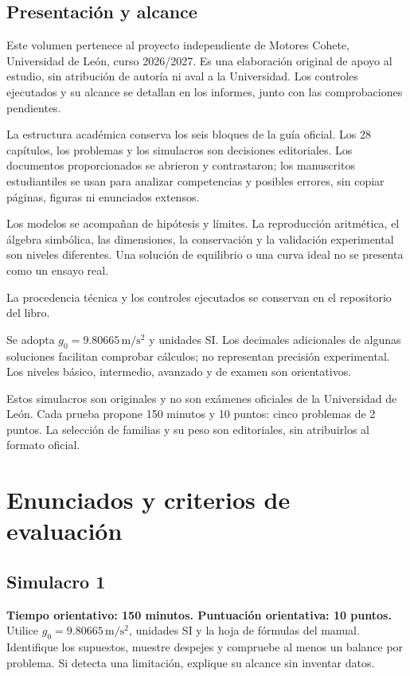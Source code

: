 
\renewcommand{\studiumvolumetype}{simulacros}

\frontmatter
\studiumreadingguide
\chapter*{Presentación y alcance}
Este volumen pertenece al proyecto independiente de Motores Cohete, Universidad de León, curso 2026/2027. Es una elaboración original de apoyo al estudio, sin atribución de autoría ni aval a la Universidad. Los controles ejecutados y su alcance se detallan en los informes, junto con las comprobaciones pendientes.

La estructura académica conserva los seis bloques de la guía oficial. Los 28 capítulos, los problemas y los simulacros son decisiones editoriales. Los documentos proporcionados se abrieron y contrastaron; los manuscritos estudiantiles se usan para analizar competencias y posibles errores, sin copiar páginas, figuras ni enunciados extensos.

Los modelos se acompañan de hipótesis y límites. La reproducción aritmética, el álgebra simbólica, las dimensiones, la conservación y la validación experimental son niveles diferentes. Una solución de equilibrio o una curva ideal no se presenta como un ensayo real.

La procedencia técnica y los controles ejecutados se conservan en el repositorio del libro.

Se adopta $g_0=9.80665\,\mathrm{m/s^2}$ y unidades SI. Los decimales adicionales de algunas soluciones facilitan comprobar cálculos; no representan precisión experimental. Los niveles básico, intermedio, avanzado y de examen son orientativos.

Estos simulacros son originales y no son exámenes oficiales de la Universidad de León. Cada prueba propone 150 minutos y 10 puntos: cinco problemas de 2 puntos. La selección de familias y su peso son editoriales, sin atribuirlos al formato oficial.
\tableofcontents
\mainmatter
\part{Enunciados y criterios de evaluación}
\chapter{Simulacro 1}
\textbf{Tiempo orientativo: 150 minutos. Puntuación orientativa: 10 puntos.} Utilice $g_0=9.80665\,\mathrm{m/s^2}$, unidades SI y la hoja de fórmulas del manual. Identifique los supuestos, muestre despejes y compruebe al menos un balance por problema. Si detecta una limitación, explique su alcance sin inventar datos.
